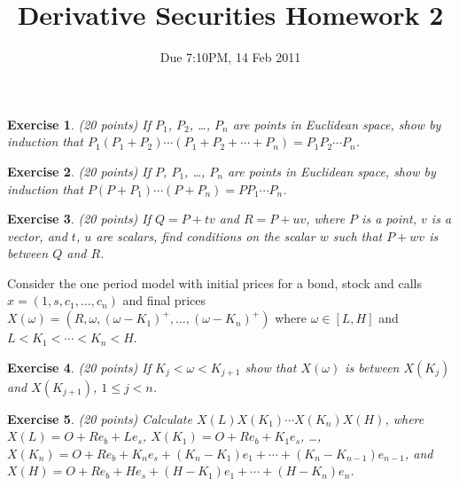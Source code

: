 \documentclass[11pt,fleqn]{amsproc}
\newtheorem{xca}{Exercise}
\begin{document}
\title{Derivative Securities Homework 2}
\author{Due 7:10PM, 14 Feb 2011}

\maketitle

\begin{xca}{(20 points)}
If $P_1$, $P_2$, \dots, $P_n$ are points in Euclidean space, show by
induction that $P_1(P_1 + P_2)\cdots(P_1 + P_2 + \cdots + P_n) = P_1
P_2 \cdots P_n$.

\end{xca}

\begin{xca}{(20 points)}
If $P$, $P_1$, \dots, $P_n$ are points in Euclidean space, show by
induction that $P(P + P_1)\cdots(P + P_n) = PP_1\cdots P_n$.

\end{xca}

\begin{xca}{(20 points)}
If $Q = P + tv$ and $R = P + uv$, where $P$ is a point, $v$ is a vector,
and $t$, $u$ are scalars, find conditions on the scalar $w$ such that $P +
wv$ is between $Q$ and $R$.

\end{xca}

Consider the one period model with initial prices for a bond, stock
and calls $x = (1, s, c_1,\dots,c_n)$ and final prices $X(\omega) =
(R, \omega, (\omega - K_1)^+,\dots,(\omega - K_n)^+)$ where $\omega\in
[L, H]$ and $L < K_1 < \cdots < K_n < H$.

\begin{xca}{(20 points)}
If $K_j < \omega < K_{j+1}$ show that $X(\omega)$ is between $X(K_j)$
and $X(K_{j+1})$, $1\le j < n$.

\end{xca}

\begin{xca}{(20 points)}
Calculate $X(L)X(K_1)\cdots X(K_n)X(H)$, where $X(L) = O + Re_b + Le_s$,
$X(K_1) = O + Re_b + K_1e_s$, \dots, $X(K_n) = O + Re_b + K_ne_s + (K_n -
K_1)e_1 + \cdots + (K_n - K_{n-1})e_{n-1}$, and $X(H) = O + Re_b + He_s +
(H - K_1)e_1 + \cdots + (H - K_n)e_n$.

\end{xca}
\end{document}
